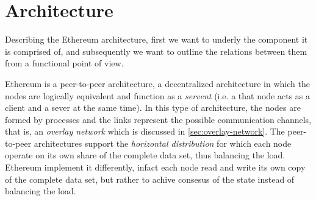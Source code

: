 \section{Architecture}

Describing the Ethereum architecture, first we want to underly the component it
is comprised of, and subsequently we want to outline the relations between them
from a functional point of view.

Ethereum is a peer-to-peer architecture, a decentralized architecture in which
the nodes are logically equivalent and function as a \emph{servent} (i.e. a that
node acts as a client and a sever at the same time). In this type of
architecture, the nodes are formed by processes and the links represent the
possible communication channels, that is, an \emph{overlay network}
\cite{van2017distributed} which is discussed in \autoref{sec:overlay-network}.
The peer-to-peer architectures support the \emph{horizontal distribution} for
which each node operate on its own share of the complete data set, thus
balancing the load. Ethereum implement it differently, infact each node read and
write its own copy of the complete data set, but rather to achive consesus of
the state instead of balancing the load.


